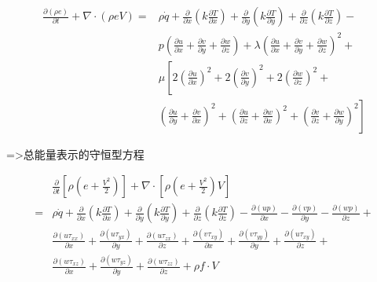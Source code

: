 \documentclass[UTF8]{ctexart}
\begin{document}
$$
	\begin{aligned}
		\frac{\partial(\rho e)}{\partial t}+\nabla \cdot(\rho e V)= & \rho \dot{q}+\frac{\partial}{\partial x}\left(k \frac{\partial T}{\partial x}\right)+\frac{\partial}{\partial y}\left(k \frac{\partial T}{\partial y}\right)+\frac{\partial}{\partial z}\left(k \frac{\partial T}{\partial z}\right)-               \\
		                                                            & p\left(\frac{\partial u}{\partial x}+\frac{\partial v}{\partial y}+\frac{\partial w}{\partial z}\right)+\lambda\left(\frac{\partial u}{\partial x}+\frac{\partial v}{\partial y}+\frac{\partial w}{\partial z}\right)^{2}+                          \\
		                                                            & \mu\left[2\left(\frac{\partial u}{\partial x}\right)^{2}+2\left(\frac{\partial v}{\partial y}\right)^{2}+2\left(\frac{\partial w}{\partial z}\right)^{2}+\right.                                                                                    \\
		                                                            & \left.\left(\frac{\partial u}{\partial y}+\frac{\partial v}{\partial x}\right)^{2}+\left(\frac{\partial u}{\partial z}+\frac{\partial w}{\partial x}\right)^{2}+\left(\frac{\partial v}{\partial z}+\frac{\partial w}{\partial y}\right)^{2}\right]
	\end{aligned}
$$


=>总能量表示的守恒型方程

$$
	\begin{aligned}
		  & \frac{\partial}{\partial t}\left[\rho\left(e+\frac{V^{2}}{2}\right)\right]+\nabla \cdot\left[\rho\left(e+\frac{V^{2}}{2}\right) V\right]                                                                                                                                                                                                 \\
		= & \rho \dot{q}+\frac{\partial}{\partial x}\left(k \frac{\partial T}{\partial x}\right)+\frac{\partial}{\partial y}\left(k \frac{\partial T}{\partial y}\right)+\frac{\partial}{\partial z}\left(k \frac{\partial T}{\partial z}\right)-\frac{\partial(u p)}{\partial x}-\frac{\partial(v p)}{\partial y}-\frac{\partial(w p)}{\partial z}+ \\
		  & \frac{\partial\left(u \tau_{x x}\right)}{\partial x}+\frac{\partial\left(u \tau_{y x}\right)}{\partial y}+\frac{\partial\left(u \tau_{z x}\right)}{\partial z}+\frac{\partial\left(v \tau_{x y}\right)}{\partial x}+\frac{\partial\left(v \tau_{y y}\right)}{\partial y}+\frac{\partial\left(u \tau_{x y}\right)}{\partial z}+           \\
		  & \frac{\partial\left(w \tau_{x z}\right)}{\partial x}+\frac{\partial\left(w \tau_{y z}\right)}{\partial y}+\frac{\partial\left(w \tau_{z z}\right)}{\partial z}+\rho f \cdot V
	\end{aligned}
$$
\end{document}
